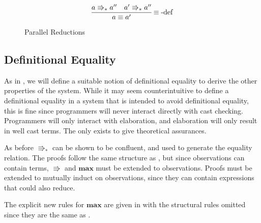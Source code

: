\begin{figure}

\[
\frac{a\Rrightarrow_{\ast}a''\quad a'\Rrightarrow_{\ast}a''}{a\equiv a'}
\operatorname{\equiv-def}
\]
\caption{\CLang{} Parallel Reductions}
\label{fig:cast-reduction}
\end{figure}
 
\subsection{Definitional Equality}
 
As in , we will define a suitable notion of definitional equality to derive the other properties of the system.
While it may seem counterintuitive to define a definitional equality in a system that is intended to avoid definitional equality, this is fine since programmers will never interact directly with cast checking.
Programmers will only interact with elaboration, and elaboration will only result in well cast terms.
The \csys{} only exists to give theoretical assurances.
 
As before $\Rrightarrow_{*}$ can be shown to be confluent, and used to generate the equality relation.
The proofs follow the same structure as , but since observations can contain terms, $\Rrightarrow$ and $\textbf{max}$ must be extended to observations.
Proofs must be extended to mutually induct on observations, since they can contain expressions that could also reduce.
 
The explicit new rules for $\textbf{max}$ are given in  with the structural rules omitted since they are the same as .
 
